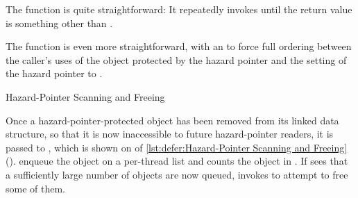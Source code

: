 \begin{fcvref}
\QuickQuizEnd

The  function is quite straightforward:
It repeatedly invokes  until the return value
is something other than .

\QuickQuizEnd

The  function is even more straightforward, with
an  to force full ordering between the caller's uses
of the object protected by the hazard pointer and the setting of
the hazard pointer to .
\end{fcvref}

\begin{listing}
\caption{Hazard-Pointer Scanning and Freeing}
\label{lst:defer:Hazard-Pointer Scanning and Freeing}
\end{listing}

\begin{fcvref}
Once a hazard-pointer-protected object has been removed from its
linked data structure, so that it is now inaccessible to future
hazard-pointer readers, it is passed to ,
which is shown on  of
\cref{lst:defer:Hazard-Pointer Scanning and Freeing}
().
enqueue the object on a per-thread list 
and  counts the object in .
If  sees that a sufficiently large number of objects are now
queued,  invokes  to attempt to
free some of them.
\end{fcvref}

